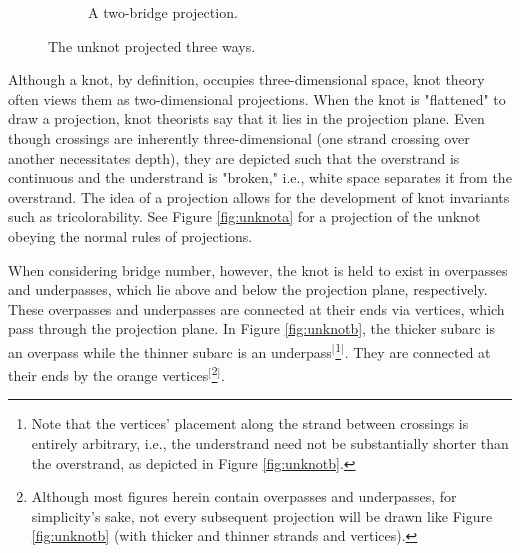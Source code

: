 \documentclass[titlepage]{article}
\begin{document}
\begin{figure}[h!]
\begin{subfigure}[b]{0.3\linewidth}
        \caption{A two-bridge projection.}
        \label{fig:unknotc}
    \end{subfigure}
    \caption{The unknot projected three ways.}
    \label{fig:unknot}
\end{figure}

\noindent Although a knot, by definition, occupies three-dimensional space, knot theory often views them as two-dimensional projections. When the knot is "flattened" to draw a projection, knot theorists say that it lies in the projection plane. Even though crossings are inherently three-dimensional (one strand crossing over another necessitates depth), they are depicted such that the overstrand is continuous and the understrand is "broken," i.e., white space separates it from the overstrand. The idea of a projection allows for the development of knot invariants such as tricolorability. See Figure \ref{fig:unknota} for a projection of the unknot obeying the normal rules of projections.\par
When considering bridge number, however, the knot is held to exist in overpasses and underpasses, which lie above and below the projection plane, respectively. These overpasses and underpasses are connected at their ends via vertices, which pass through the projection plane. In Figure \ref{fig:unknotb}, the thicker subarc is an overpass while the thinner subarc is an underpass$^[$\footnote{Note that the vertices' placement along the strand between crossings is entirely arbitrary, i.e., the understrand need not be substantially shorter than the overstrand, as depicted in Figure \ref{fig:unknotb}.}$^]$. They are connected at their ends by the orange vertices$^[$\footnote{Although most figures herein contain overpasses and underpasses, for simplicity's sake, not every subsequent projection will be drawn like Figure \ref{fig:unknotb} (with thicker and thinner strands and vertices).}$^]$.\par
\end{document}
